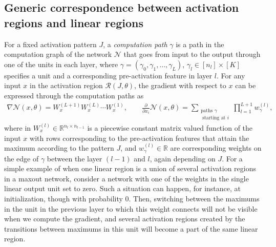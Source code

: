 \documentclass{article}
\theoremstyle{definition}
\newcommand{\net}{\mathcal{N}}
\begin{document}
\subsection{Generic correspondence between activation regions and linear regions}

For a fixed activation pattern $J$, a \emph{computation path} $\gamma$ is a path in the computation graph of the network $\net$ that goes from input to the output through one of the units in each layer, where $\gamma = (\gamma_0,\gamma_1,\ldots,\gamma_L)$, $\gamma_l\in[n_l]\times[K]$ specifies a unit and a corresponding pre-activation feature in layer $l$.
For any input $x$ in the activation region $\mathcal{R}(J,\theta)$, the gradient with respect to $x$ can be expressed through the computation paths as 
\begin{align*}
\nabla \net(x,\theta) = W_x^{(L+1)}W_x^{(L)} \cdots W_x^{(1)}, \qquad  
\frac{\partial}{\partial x_i} \net(x,\theta) = \sum_{\substack{\text{paths }\gamma\\\text{ starting at $i$}}} \prod_{l=1}^{L+1} w_{\gamma}^{(l)},
\end{align*}
where in $W_x^{(l)} \in \mathbb{R}^{n_{l}\times n_{l-1}}$ is a piecewise constant matrix valued function of the input $x$ with rows corresponding to the pre-activation features that attain the maximum according to the pattern $J$, 
and $w_{\gamma}^{(l)}\in\mathbb{R}$ are corresponding weights on the edge of $\gamma$ between the layer $(l - 1)$ and $l$, again depending on $J$. 
For a simple example of when one linear region is a union of several activation regions in a maxout network, consider a network with one of the weights in the single linear output unit set to zero. Such a situation can happen, for instance, at initialization, though with probability $0$. Then, switching between the maximums in the unit in the previous layer to which this weight connects will not be visible when we compute the gradient, and several activation regions created by the transitions between maximums in this unit will become a part of the same linear region. 
\end{document}
